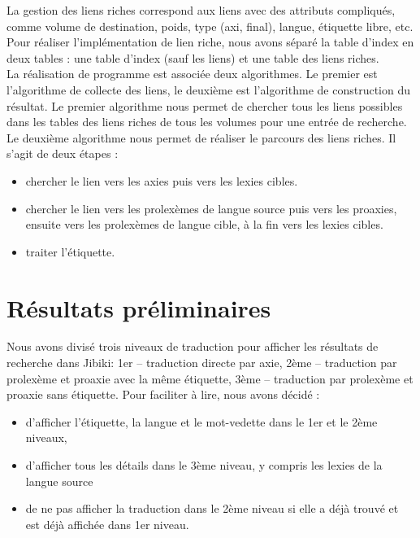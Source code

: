 \documentclass[10pt,a4paper,twoside]{article}
\begin{document}
La gestion des liens riches correspond aux liens avec des attributs compliqués, comme volume de destination, poids, type (axi, final), langue, étiquette libre, etc. Pour réaliser l’implémentation de lien riche,  nous avons séparé la table d’index en deux tables : une table d’index (sauf les liens) et une table des liens riches. \\ 
La réalisation de programme est associée deux algorithmes. Le premier est l’algorithme de collecte des liens, le deuxième est l’algorithme de construction du résultat.  Le premier algorithme nous permet de chercher tous les liens possibles dans les tables des liens riches de tous les volumes pour une entrée de recherche. Le deuxième algorithme nous permet de réaliser le parcours des liens riches. Il s’agit de deux étapes :
\begin{itemize}
\item chercher le lien vers les axies puis vers les lexies cibles.
\item chercher le lien vers les prolexèmes de langue source puis vers les proaxies, ensuite vers les prolexèmes de langue cible, à la fin vers les lexies cibles.
\item traiter l'étiquette.
\end{itemize}


\section{Résultats préliminaires}

Nous avons divisé trois niveaux de traduction pour afficher les résultats de recherche dans Jibiki: 1er – traduction directe par axie, 2ème – traduction par prolexème et proaxie avec la même étiquette, 3ème – traduction par prolexème et proaxie sans étiquette.  Pour faciliter à lire, nous avons décidé : 
\begin{itemize}
\item d’afficher l’étiquette, la langue et le mot-vedette dans le 1er et le 2ème niveaux, 
\item d’afficher tous les détails dans le 3ème niveau, y compris les lexies de la langue source
\item de ne pas afficher la traduction dans le 2ème niveau si elle a déjà trouvé et est déjà affichée dans 1er niveau.
\end{itemize}
\end{document}
